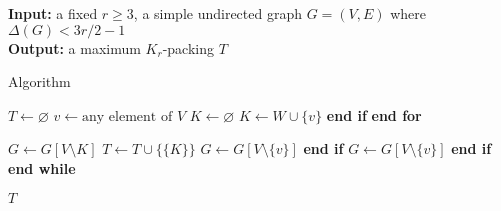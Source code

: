 \begin{algorithm}
\textbf{Input:} a fixed $r\geq 3$, a simple undirected graph $G=(V, E)$ where $\Delta(G) < 3r/2 - 1$\\
\textbf{Output:} a maximum $K_r$-packing $T$
\smallskip
\begin{algorithmic}
\caption{Algorithm~\label{alg:krpacking_r}} 
\State $T\gets\varnothing$
    \State $v\gets \text{any element of }V$
        \State $K\gets \varnothing$
                \State $K \gets W \cup \{ v \}$
            \EndIf
            \State \textbf{end if}
        \EndFor
        \State \textbf{end for}
        \smallskip
        
            \State $G \gets G[V \setminus K]$
            \State $T \gets T \cup \{ \{ K \} \}$
        \Else
            \State $G \gets G[V \setminus \{ v \}]$
        \EndIf
        \State \textbf{end if}
    \Else
        \State $G \gets G[V \setminus \{ v \}]$
    \EndIf
    \State \textbf{end if}
\EndWhile
\State \textbf{end while}
\smallskip

\State \Return $T$
\end{algorithmic}
\end{algorithm}